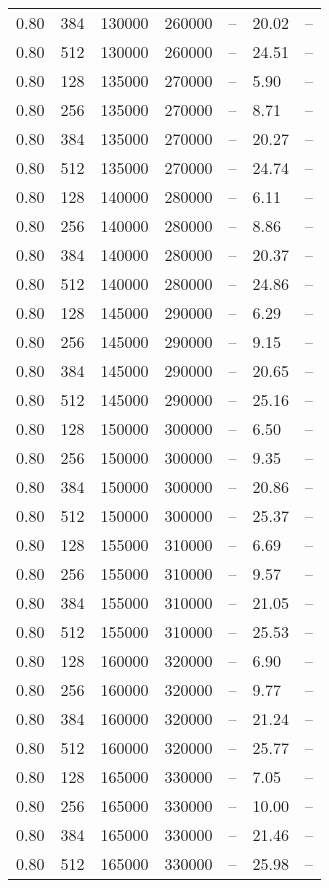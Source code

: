 \begin{tabular}{l|l|l|l|l|l|l}
0.80 & 384 & 130000 & 260000 & -- & 20.02 & --\\
0.80 & 512 & 130000 & 260000 & -- & 24.51 & --\\
0.80 & 128 & 135000 & 270000 & -- &  5.90 & --\\
0.80 & 256 & 135000 & 270000 & -- &  8.71 & --\\
0.80 & 384 & 135000 & 270000 & -- & 20.27 & --\\
0.80 & 512 & 135000 & 270000 & -- & 24.74 & --\\
0.80 & 128 & 140000 & 280000 & -- &  6.11 & --\\
0.80 & 256 & 140000 & 280000 & -- &  8.86 & --\\
0.80 & 384 & 140000 & 280000 & -- & 20.37 & --\\
0.80 & 512 & 140000 & 280000 & -- & 24.86 & --\\
0.80 & 128 & 145000 & 290000 & -- &  6.29 & --\\
0.80 & 256 & 145000 & 290000 & -- &  9.15 & --\\
0.80 & 384 & 145000 & 290000 & -- & 20.65 & --\\
0.80 & 512 & 145000 & 290000 & -- & 25.16 & --\\
0.80 & 128 & 150000 & 300000 & -- &  6.50 & --\\
0.80 & 256 & 150000 & 300000 & -- &  9.35 & --\\
0.80 & 384 & 150000 & 300000 & -- & 20.86 & --\\
0.80 & 512 & 150000 & 300000 & -- & 25.37 & --\\
0.80 & 128 & 155000 & 310000 & -- &  6.69 & --\\
0.80 & 256 & 155000 & 310000 & -- &  9.57 & --\\
0.80 & 384 & 155000 & 310000 & -- & 21.05 & --\\
0.80 & 512 & 155000 & 310000 & -- & 25.53 & --\\
0.80 & 128 & 160000 & 320000 & -- &  6.90 & --\\
0.80 & 256 & 160000 & 320000 & -- &  9.77 & --\\
0.80 & 384 & 160000 & 320000 & -- & 21.24 & --\\
0.80 & 512 & 160000 & 320000 & -- & 25.77 & --\\
0.80 & 128 & 165000 & 330000 & -- &  7.05 & --\\
0.80 & 256 & 165000 & 330000 & -- & 10.00 & --\\
0.80 & 384 & 165000 & 330000 & -- & 21.46 & --\\
0.80 & 512 & 165000 & 330000 & -- & 25.98 & --\\

\end{tabular}
